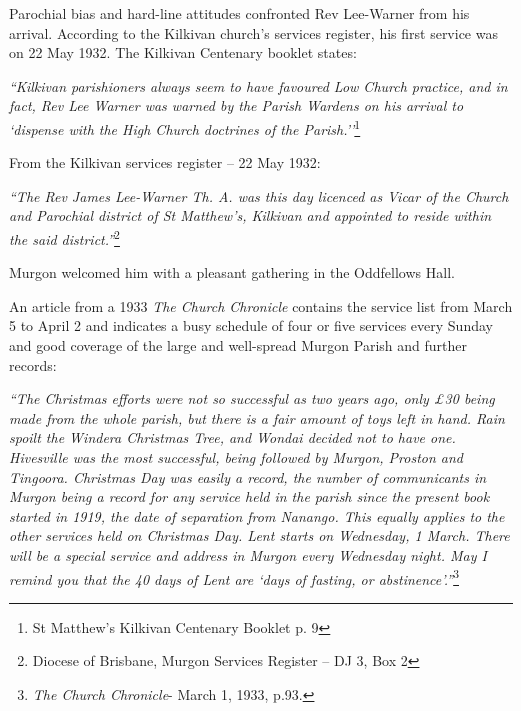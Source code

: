 Parochial bias and hard-line attitudes confronted Rev Lee-Warner from his arrival. According to the Kilkivan church's services register, his first service was on 22 May 1932. The Kilkivan Centenary booklet states:



\emph{``Kilkivan parishioners always seem to have favoured Low Church practice, and in fact, Rev Lee Warner was warned by the Parish Wardens on his arrival to `dispense with the High Church doctrines of the Parish.''}\footnote{St Matthew's Kilkivan Centenary Booklet p. 9}


From the Kilkivan services register -- 22 May 1932:



\emph{``The Rev James Lee-Warner Th. A. was this day licenced as Vicar of the Church and Parochial district of St Matthew's, Kilkivan and appointed to reside within the said district.''}\footnote{Diocese of Brisbane, Murgon Services Register -- DJ 3, Box 2}


Murgon welcomed him with a pleasant gathering in the Oddfellows Hall.



An article from a 1933 \emph{The Church Chronicle} contains the service list from March 5 to April 2 and indicates a busy schedule of four or five services every Sunday and good coverage of the large and well-spread Murgon Parish and further records:



\emph{``The Christmas efforts were not so successful as two years ago, only \pounds30 being made from the whole parish, but there is a fair amount of toys left in hand. Rain spoilt the Windera Christmas Tree, and Wondai decided not to have one. Hivesville was the most successful, being followed by Murgon, Proston and Tingoora. Christmas Day was easily a record, the number of communicants in Murgon being a record for any service held in the parish since the present book started in 1919, the date of separation from Nanango. This equally applies to the other services held on Christmas Day. Lent starts on Wednesday, 1 March. There will be a special service and address in Murgon every Wednesday night. May I remind you that the 40 days of Lent are `days of fasting, or abstinence'.''}\footnote{\emph{The Church Chronicle}- March 1, 1933, p.93.}


\medskip








